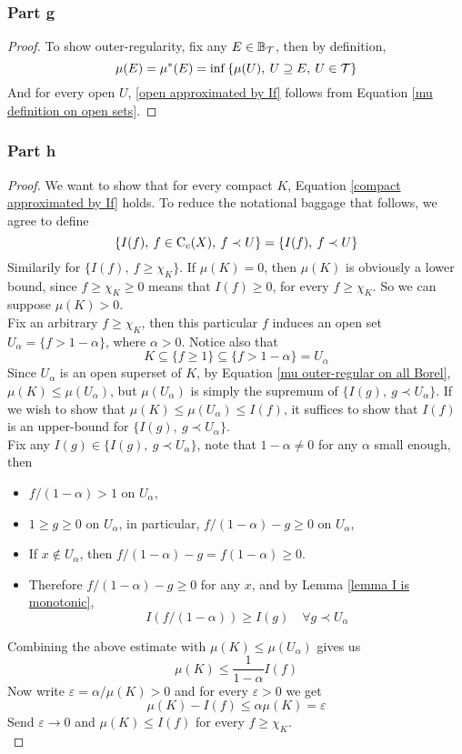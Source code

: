 \documentclass[../../main.tex]{subfiles}
\begin{document}
\subsubsection*{Part g}
\begin{proof}
    To show outer-regularity, fix any $E\in\mathbb{B}_{\mathcal{T}}$, then by definition,
    \[
    \mu(E) =\mu^*(E)= \inf\left\{\mu(U),\:U\supseteq E,\:U\in\mathcal{T}\right\}
    \]
    And for every open $U$, \eqref{open approximated by If} follows from Equation \eqref{mu definition on open sets}.
\end{proof}
\subsubsection*{Part h}
\begin{proof}
We want to show that for every compact $K$, Equation \eqref{compact approximated by If} holds. To reduce the notational baggage that follows, we agree to define
\[
\left\{I(f),\: f\in\operatorname{C}_c({X}),\:f\prec U\right\} = \{I(f),\: f\prec U\}
\]
Similarily for $\{I(f),\: f\geq \chi_K\}$. If $\mu(K)=0$, then $\mu(K)$ is obviously a lower bound, since $f\geq \chi_K\geq 0$ means that $I(f)\geq 0$, for every $f\geq \chi_K$. So we can suppose $\mu(K)>0$.\\

Fix an arbitrary $f\geq \chi_K$, then this particular $f$ induces an open set $U_\alpha=\{f>1-\alpha\}$, where $\alpha>0$. Notice also that
\[
K\subseteq\{f\geq 1\}\subseteq \{f>1-\alpha\}=U_\alpha
\]
Since $U_\alpha$ is an open superset of $K$, by Equation \eqref{mu outer-regular on all Borel}, $\mu(K)\leq \mu(U_\alpha)$, but $\mu(U_\alpha)$ is simply the supremum of $\{I(g),\:g\prec U_\alpha\}$. If we wish to show that $\mu(K)\leq \mu(U_\alpha)\leq I(f)$, it suffices to show that $I(f)$ is an upper-bound for $\{I(g),\:g\prec U_\alpha\}$.\\

Fix any $I(g)\in\{I(g),\:g\prec U_\alpha\}$, note that $1-\alpha\neq 0$ for any $\alpha$ small enough, then 
\begin{itemize}
    \item $f/(1-\alpha)>1$ on $U_\alpha$,
    \item $1\geq g\geq 0$ on $U_\alpha$, in particular, $f/(1-\alpha)-g\geq 0$ on $U_\alpha$,
    \item If $x\notin U_\alpha$, then $f/(1-\alpha)-g = f(1-\alpha)\geq 0$.
    \item Therefore $f/(1-\alpha)-g\geq 0$ for any $x$, and by Lemma \ref{lemma I is monotonic},
    \[
    I(f/(1-\alpha))\geq I(g)\quad\forall g\prec U_\alpha
    \]
\end{itemize}
Combining the above estimate with $\mu(K)\leq \mu(U_\alpha)$ gives us
\[
\mu(K)\leq \dfrac{1}{1-\alpha}I(f)
\]
Now write $\varepsilon = \alpha/\mu(K)>0$ and for every $\varepsilon>0$ we get
\[
\mu(K)-I(f)\leq\alpha\mu(K)=\varepsilon
\]
Send $\varepsilon\to 0$ and $\mu(K)\leq I(f)$ for every $f\geq\chi_K$.\\ 


\end{proof}
\end{document}
